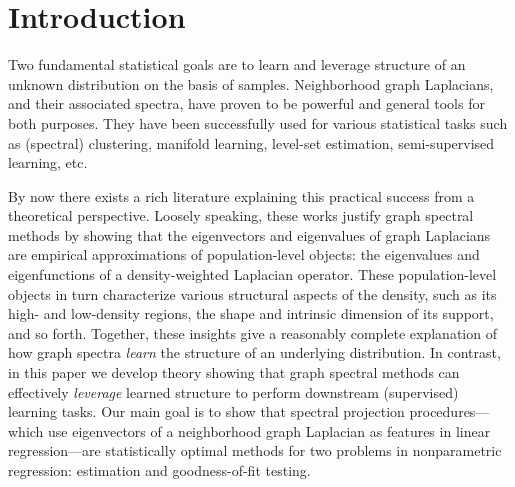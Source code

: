 \section{Introduction}
\label{sec:introduction}
Two fundamental statistical goals are to learn and leverage structure of an unknown distribution on the basis of samples. Neighborhood graph Laplacians, and their associated spectra, have proven to be powerful and general tools for both purposes. They have been successfully used for various statistical tasks such as (spectral) clustering, manifold learning, level-set estimation, semi-supervised learning, etc.

By now there exists a rich literature \citep{koltchinskii2000,belkin07,vonluxburg2008,burago2014,shi2015,singer2017,garciatrillos18,trillos2019, calder2019, cheng2021,dunson2021} explaining this practical success from a theoretical perspective. Loosely speaking, these works justify graph spectral methods by showing that the eigenvectors and eigenvalues of graph Laplacians are empirical approximations of population-level objects: the eigenvalues and eigenfunctions of a density-weighted Laplacian operator. These population-level objects in turn characterize various structural aspects of the density, such as its high- and low-density regions, the shape and intrinsic dimension of its support, and so forth. Together, these insights give a reasonably complete explanation of how graph spectra \emph{learn} the structure of an underlying distribution. In contrast, in this paper we develop theory showing that graph spectral methods can effectively \emph{leverage} learned structure to perform downstream (supervised) learning tasks. Our main goal is to show that spectral projection procedures---which use eigenvectors of a neighborhood graph Laplacian as features in linear regression---are statistically optimal methods for two problems in nonparametric regression: estimation and goodness-of-fit testing.


